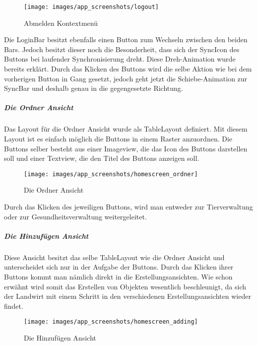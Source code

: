 \begin{itemize}
\begin{figure}[H]
\centering
\texttt{[image: images/app\_screenshots/logout]}
\caption{Abmelden Kontextmenü}
\end{figure}

Die LoginBar besitzt ebenfalls einen Button zum Wechseln zwischen den beiden Bars. Jedoch besitzt dieser noch die Besonderheit, dass sich der SyncIcon des Buttons bei laufender Synchronisierung dreht. Diese Dreh-Animation wurde bereits erklärt. Durch das Klicken des Buttons wird die selbe Aktion wie bei dem vorherigen Button in Gang gesetzt, jedoch geht jetzt die Schiebe-Animation zur SyncBar und deshalb genau in die gegengesetzte Richtung.

\subparagraph{Die Ordner Ansicht}
Das Layout für die Ordner Ansicht wurde als TableLayout definiert. Mit diesem Layout ist es einfach möglich die Buttons in einem Raster anzuordnen. Die Buttons selber besteht aus einer Imageview, die das Icon des Buttons darstellen soll und einer Textview, die den Titel des Buttons anzeigen soll.

\begin{figure}[H]
\centering
\texttt{[image: images/app\_screenshots/homescreen\_ordner]}
\caption{Die Ordner Ansicht}
\end{figure}

Durch das Klicken des jeweiligen Buttons, wird man entweder zur Tierverwaltung oder zur Gesundheitsverwaltung weitergeleitet.



\subparagraph{Die Hinzufügen Ansicht}
Diese Ansicht besitzt das selbe TableLayout wie die Ordner Ansicht und unterscheidet sich nur in der Aufgabe der Buttons. 
Durch das Klicken ihrer Buttons kommt man nämlich direkt in die Erstellungsansichten. Wie schon erwähnt wird somit das Erstellen von Objekten wesentlich beschleunigt, da sich der Landwirt mit einem Schritt in den verschiedenen Erstellungsansichten wieder findet.

\begin{figure}[H]
\centering
\texttt{[image: images/app\_screenshots/homescreen\_adding]}
\caption{Die Hinzufügen Ansicht}
\end{figure}

\end{itemize}






